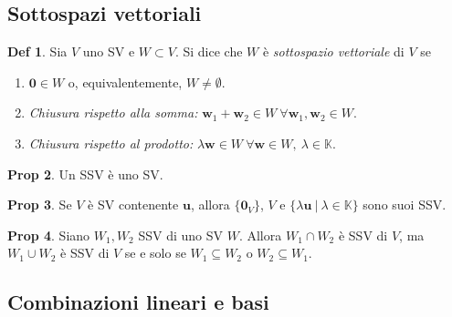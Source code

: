\documentclass[]{article}
\newcommand{\bl}[1]{\mathbf{#1}}
\newcommand{\vu}{\mathbf{u}}
\newcommand{\vw}{\mathbf{w}}
\theoremstyle{definition}
\theoremstyle{definition}
\newtheorem{prop}{Prop}[subsection]
\theoremstyle{definition}
\newtheorem{dfn}[prop]{Def}
\begin{document}
\subsection{Sottospazi vettoriali}

 \begin{dfn} Sia $V$ uno SV e $W \subset V$. Si dice che $W$ è \emph{sottospazio vettoriale} di $V$ se
\begin{enumerate}
	\item $\bl{0} \in W$ o, equivalentemente, $W \neq \emptyset$.
	\item \emph{Chiusura rispetto alla somma:} $\vw _1 + \vw _2 \in W \ \forall \vw _1 , \vw _2 \in W$.
	\item \emph{Chiusura rispetto al prodotto:} $\lambda \vw  \in W \ \forall \vw \in W, \ \lambda \in \mathbb{K}$.
\end{enumerate}

 \end{dfn} \begin{prop} Un SSV è uno SV.

\end{prop} \begin{prop} Se $V$ è SV contenente $\vu$, allora $\{\bl{0}_V\}$, $V$ e $\{\lambda \vu \ |\ \lambda \in \mathbb{K}\}$ sono suoi SSV.

\end{prop} \begin{prop} Siano $W_1 , W_2$ SSV di uno SV $W$. Allora $W_1 \cap W_2$ è SSV di $V$, ma $W_1 \cup W_2$ è SSV di $V$ se e solo se $W_1 \subseteq W_2$ o $W_2 \subseteq W_1$.
\end{prop}

\subsection{Combinazioni lineari e basi} 
\end{document}
